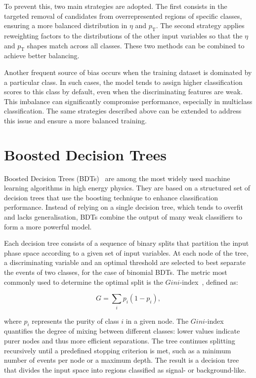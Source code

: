 To prevent this, two main strategies are adopted. The first consists in the targeted removal of candidates from overrepresented regions of specific classes, ensuring a more balanced distribution in $\eta$ and $p_{\text{T}}$. The second strategy applies reweighting factors to the distributions of the other input variables so that the $\eta$ and $p_{\text{T}}$ shapes match across all classes. These two methods can be combined to achieve better balancing.

Another frequent source of bias occurs when the training dataset is dominated by a particular class. In such cases, the model tends to assign higher classification scores to this class by default, even when the discriminating features are weak. This imbalance can significantly compromise performance, especially in multiclass classification. The same strategies described above can be extended to address this issue and ensure a more balanced training.



\section{Boosted Decision Trees}
\label{sec:bdt_general}

Boosted Decision Trees (BDTs)~\cite{bdts} are among the most widely used machine learning algorithms in high energy physics. They are based on a structured set of decision trees that use the boosting technique to enhance classification performance. Instead of relying on a single decision tree, which tends to overfit and lacks generalisation, BDTs combine the output of many weak classifiers to form a more powerful model.

Each decision tree consists of a sequence of binary splits that partition the input phase space according to a given set of input variables. At each node of the tree, a discriminating variable and an optimal threshold are selected to best separate the events of two classes, for the case of binomial BDTs. The metric most commonly used to determine the optimal split is the $Gini$-index~\cite{gini}, defined as:

\begin{equation}
G = \sum_{i} p_i (1 - p_i),
\end{equation}

where $p_i$ represents the purity of class $i$ in a given node. The $Gini$-index quantifies the degree of mixing between different classes: lower values indicate purer nodes and thus more efficient separations. The tree continues splitting recursively until a predefined stopping criterion is met, such as a minimum number of events per node or a maximum depth. The result is a decision tree that divides the input space into regions classified as signal- or background-like.

